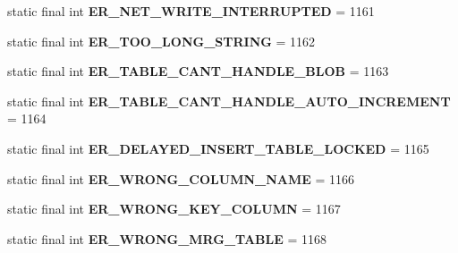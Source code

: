 \begin{DoxyCompactItemize}
static final int {\bfseries E\+R\+\_\+\+N\+E\+T\+\_\+\+W\+R\+I\+T\+E\+\_\+\+I\+N\+T\+E\+R\+R\+U\+P\+T\+ED} = 1161
\item 
\mbox{\label{classcom_1_1mysql_1_1jdbc_1_1_mysql_error_numbers_a0e656ed349a810e103b50329d0e71537}} 
static final int {\bfseries E\+R\+\_\+\+T\+O\+O\+\_\+\+L\+O\+N\+G\+\_\+\+S\+T\+R\+I\+NG} = 1162
\item 
\mbox{\label{classcom_1_1mysql_1_1jdbc_1_1_mysql_error_numbers_a5631abc7c8a2c458858f75eade008a2d}} 
static final int {\bfseries E\+R\+\_\+\+T\+A\+B\+L\+E\+\_\+\+C\+A\+N\+T\+\_\+\+H\+A\+N\+D\+L\+E\+\_\+\+B\+L\+OB} = 1163
\item 
\mbox{\label{classcom_1_1mysql_1_1jdbc_1_1_mysql_error_numbers_a6725981b7cf6ee835dea27d9802e531e}} 
static final int {\bfseries E\+R\+\_\+\+T\+A\+B\+L\+E\+\_\+\+C\+A\+N\+T\+\_\+\+H\+A\+N\+D\+L\+E\+\_\+\+A\+U\+T\+O\+\_\+\+I\+N\+C\+R\+E\+M\+E\+NT} = 1164
\item 
\mbox{\label{classcom_1_1mysql_1_1jdbc_1_1_mysql_error_numbers_ad8f86994bcdc323a2d4f656a37079d2b}} 
static final int {\bfseries E\+R\+\_\+\+D\+E\+L\+A\+Y\+E\+D\+\_\+\+I\+N\+S\+E\+R\+T\+\_\+\+T\+A\+B\+L\+E\+\_\+\+L\+O\+C\+K\+ED} = 1165
\item 
\mbox{\label{classcom_1_1mysql_1_1jdbc_1_1_mysql_error_numbers_ac9985ffe47c8e0850a075e7a16948871}} 
static final int {\bfseries E\+R\+\_\+\+W\+R\+O\+N\+G\+\_\+\+C\+O\+L\+U\+M\+N\+\_\+\+N\+A\+ME} = 1166
\item 
\mbox{\label{classcom_1_1mysql_1_1jdbc_1_1_mysql_error_numbers_ac967453620e65ad6d22c83fbabe90f08}} 
static final int {\bfseries E\+R\+\_\+\+W\+R\+O\+N\+G\+\_\+\+K\+E\+Y\+\_\+\+C\+O\+L\+U\+MN} = 1167
\item 
\mbox{\label{classcom_1_1mysql_1_1jdbc_1_1_mysql_error_numbers_ab6ce067d9b759e205d0202688f6d137e}} 
static final int {\bfseries E\+R\+\_\+\+W\+R\+O\+N\+G\+\_\+\+M\+R\+G\+\_\+\+T\+A\+B\+LE} = 1168

\end{DoxyCompactItemize}
